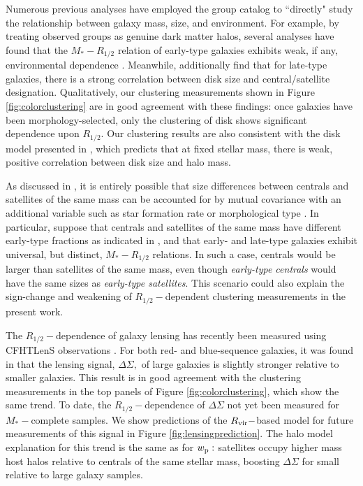 \documentclass[usenatbib,usegraphicx,letterpaper]{mn2e}
\newcommand{\rhalf}{R_{1/2}}
\newcommand{\mstar}{M_{\ast}}
\newcommand{\rvir}{R_{\rm vir}}
\newcommand{\wproj}{w_{\rm p}}
\begin{document}
Numerous previous analyses have employed the \citet{yang_etal05b} group catalog to ``directly" study the relationship between galaxy mass, size, and environment. For example, by treating observed groups as genuine dark matter halos, several analyses have found that the $\mstar-\rhalf$ relation of early-type galaxies exhibits weak, if any, environmental dependence \citep{weinmann_etal08,huertas_company_etal13b,shankar_etal14}. Meanwhile, \citet{weinmann_etal08} additionally find that for late-type galaxies, there is a strong correlation between disk size and central/satellite designation. Qualitatively, our clustering measurements shown in Figure \ref{fig:colorclustering} are in good agreement with these findings: once galaxies have been morphology-selected, only the clustering of disk shows significant dependence upon $\rhalf.$ Our clustering results are also consistent with the disk model presented in \citet{dutton_etal08,dutton_etal10}, which predicts that at fixed stellar mass, there is weak, positive correlation between disk size and halo mass.

As discussed in \citet{spindler_wake17}, it is entirely possible that size differences between centrals and satellites of the same mass can be accounted for by mutual covariance with an additional variable such as star formation rate or morphological type \citep[see also][for an explicit demonstration of this scenario]{lilly_carollo16}. In particular, suppose that centrals and satellites of the same mass have different early-type fractions as indicated in \citet{weinmann_etal06}, and that early- and late-type galaxies exhibit universal, but distinct, $\mstar-\rhalf$ relations. In such a case, centrals would be larger than satellites of the same mass, even though {\em early-type centrals} would have the same sizes as {\em early-type satellites}. This scenario could also explain the sign-change and weakening of $\rhalf-$dependent clustering measurements in the present work.

The $\rhalf-$dependence of galaxy lensing has recently been measured using CFHTLenS observations \citep{heymans_etal12,erben_etal13}. For both red- and blue-sequence galaxies, it was found in \citet{charlton_etal17} that the lensing signal, $\Delta\Sigma,$ of large galaxies is slightly stronger relative to smaller galaxies. This result is in good agreement with the clustering measurements in the top panels of Figure \ref{fig:colorclustering}, which show the same trend. To date, the $\rhalf-$dependence of $\Delta\Sigma$ not yet been measured for $\mstar-$complete samples. We show  predictions of the $\rvir-$based model for future measurements of this signal in Figure \ref{fig:lensingprediction}. The halo model explanation for this trend is the same as for $\wproj:$ satellites occupy higher mass host halos relative to centrals of the same stellar mass, boosting $\Delta\Sigma$ for small relative to large galaxy samples.
\end{document}
